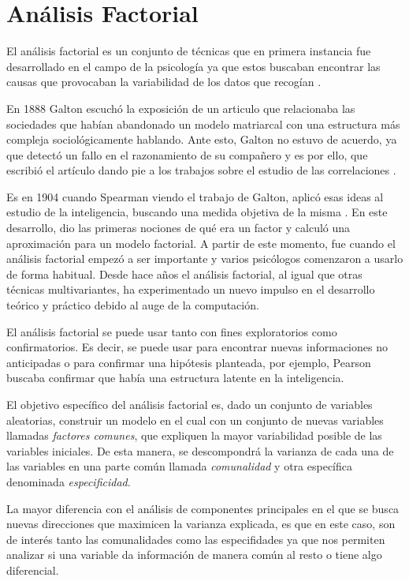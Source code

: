 \newpage
\section{Análisis Factorial}

\noindent El análisis factorial es un conjunto de técnicas que en primera instancia fue desarrollado en el campo de la psicología ya que estos buscaban encontrar las causas que provocaban la variabilidad de los datos que recogían \cite{Vincent 1953}. 

\noindent En 1888 Galton escuchó la exposición de un articulo que relacionaba las sociedades que habían abandonado un modelo matriarcal con una estructura más compleja sociológicamente hablando. Ante esto, Galton no estuvo de acuerdo, ya que detectó un fallo en el razonamiento de su compañero y es por ello, que escribió el artículo  dando pie a los trabajos sobre el estudio de las correlaciones \cite{Galton 1889}.   

\noindent Es en 1904 cuando Spearman  viendo el trabajo de Galton, aplicó esas ideas al estudio de la inteligencia, buscando una medida objetiva de la misma \cite{Spearman 1904}. En este desarrollo, dio las primeras nociones de qué era un factor y calculó una aproximación para un modelo factorial. A partir de este momento, fue cuando el análisis factorial empezó a ser importante y varios psicólogos comenzaron a usarlo de forma habitual. 
Desde hace años el análisis factorial, al igual que otras técnicas multivariantes, ha experimentado un nuevo impulso en el desarrollo teórico y práctico debido al auge de la computación. 

\noindent El análisis factorial se puede usar tanto con fines exploratorios como confirmatorios. Es decir, se puede usar para encontrar nuevas informaciones no anticipadas o para confirmar una hipótesis planteada, por ejemplo, Pearson buscaba confirmar que había una estructura latente en la inteligencia\cite{Hair 1995}.

\noindent El objetivo específico del análisis factorial es, dado un conjunto de variables aleatorias, construir un modelo en el cual con un conjunto de nuevas variables llamadas \emph{factores comunes}, que expliquen la mayor variabilidad posible de las variables iniciales. De esta manera, se descompondrá la varianza de cada una de las variables en una parte común llamada \emph{comunalidad}  y otra específica denominada \emph{especificidad}. 

\noindent La mayor diferencia con el análisis de componentes principales en el que se busca nuevas direcciones que maximicen la varianza explicada, es que en este caso, son de interés tanto las comunalidades como las especifidades ya que nos permiten analizar si una variable da información de manera común al resto o tiene algo diferencial. 

